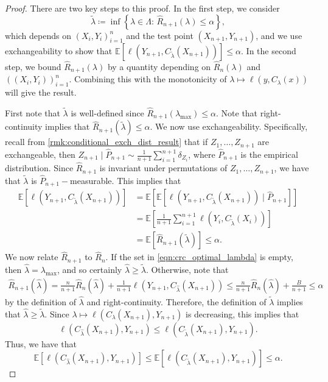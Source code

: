 \documentclass[11pt, titlepage]{article} %
\newcommand{\R}{\mathrm}
\newcommand{\Exp}[3]{\mathbb{E}\left#2 #1 \right#3}
\numberwithin{equation}{section}
\theoremstyle{definition}
\numberwithin{theorem}{section}
\numberwithin{lemma}{section}
\numberwithin{corollary}{section}
\numberwithin{proposition}{section}
\numberwithin{definition}{section}
\numberwithin{remark}{section}
\begin{document}
\begin{proof}
    There are two key steps to this proof. In the first step, we consider
    \[\tilde{\lambda} \coloneqq \inf \left\{ \lambda \in \Lambda: \, \hat{R}_{n+1}(\lambda) \leq \alpha \right\}, \] which depends on \((X_i, Y_i)_{i=1}^{n}\) and the test point \((X_{n+1}, Y_{n+1})\), and we use exchangeability to show that \(\Exp{\ell(Y_{n+1}, C_{\tilde{\lambda}}(X_{n+1}))}{[}{]} \leq \alpha\). In the second step, we bound \(\hat{R}_{n+1}(\lambda)\) by a quantity depending on \(\hat{R}_{n}(\lambda)\) and \(((X_i, Y_i))_{i=1}^n\). Combining this with the monotonicity of \(\lambda \mapsto \ell(y, C_\lambda(x))\) will give the result. \vskip5pt

    \noindent
    First note that \(\tilde{\lambda}\) is well-defined since
    \(\hat{R}_{n+1}(\lambda_{\R{max}}) \leq \alpha\). Note that right-continuity implies that \(\hat{R}_{n+1}(\tilde{\lambda}) \leq \alpha\). We now use exchangeability. Specifically, recall from \cref{rmk:conditional_exch_dist_result} that if \(Z_1, \ldots, Z_{n+1}\) are exchangeable, then \(Z_{n+1} \mid \hat{P}_{n+1} \sim \frac{1}{n+1} \sum_{i=1}^{n+1} \delta_{Z_i}\), where \(\hat{P}_{n+1}\) is the empirical distribution. Since \(\hat{R}_{n+1}\) is invariant under permutations of \(Z_1, \ldots, Z_{n+1}\), we have that \(\tilde{\lambda}\) is \(\hat{P}_{n+1}-\)measurable. This implies that \begin{align*}
        \Exp{\ell(Y_{n+1}, C_{\tilde{\lambda}}(X_{n+1}))}{[}{]} &= \Exp{\Exp{\ell(Y_{n+1}, C_{\tilde{\lambda}}(X_{n+1})) \mid \hat{P}_{n+1} }{[}{]}}{[}{]} \\
        &= \Exp{\frac{1}{n+1} \sum_{i=1}^{n+1} \ell(Y_{i}, C_{\tilde{\lambda}}(X_i))}{[}{]} \\
        &= \Exp{\hat{R}_{n+1}(\tilde{\lambda})}{[}{]} \leq \alpha.
    \end{align*}
    \noindent
    We now relate \(\hat{R}_{n+1}\) to \(\hat{R}_n\). If the set in \eqref{eqn:crc_optimal_lambda} is empty, then \(\hat{\lambda} = \lambda_\R{max}\), and so certainly \(\hat{\lambda} \geq \tilde{\lambda}.\) Otherwise, note that \begin{align*}
    \hat{R}_{n+1}(\hat{\lambda}) = \frac{n}{n+1} \hat{R}_n(\hat{\lambda}) + \frac{1}{n+1} \ell(Y_{n+1}, C_{\hat{\lambda}}(X_{n+1})) \leq \frac{n}{n+1}\hat{R}_n(\hat{\lambda}) + \frac{B}{n+1} \leq \alpha
\end{align*} by the definition of \(\hat{\lambda}\) and right-continuity. Therefore, the definition of \(\tilde{\lambda}\) implies that \(\hat{\lambda} \geq \tilde{\lambda}\). Since \(\lambda \mapsto \ell(C_\lambda (X_{n+1}), Y_{n+1})\) is decreasing, this implies that \[\ell(C_{\hat{\lambda}} (X_{n+1}), Y_{n+1}) \leq \ell(C_{\tilde{\lambda}} (X_{n+1}), Y_{n+1}).\] Thus, we have that \[\Exp{\ell(C_{\hat{\lambda}} (X_{n+1}), Y_{n+1})}{[}{]} \leq \Exp{\ell(C_{\tilde{\lambda}} (X_{n+1}), Y_{n+1})}{[}{]} \leq \alpha.\]
\end{proof}
\end{document}
